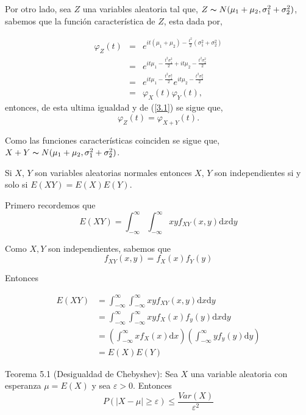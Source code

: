 \documentclass[
  letterpaper,
  DIV=11,
  numbers=noendperiod]{scrreprt}
\begin{document}
Por otro lado, sea \(Z\) una variables aleatoria tal que,
\(Z\thicksim N(\mu_{1}+\mu_{2},\sigma_{1}^{2}+\sigma_{2}^{2})\), sabemos
que la función característica de \(Z\), esta dada por,

\begin{eqnarray*}
\varphi_{Z}(t) & = & e^{it(\mu_{1}+\mu_{2})-\frac{t^{2}}{2}(\sigma_{1}^{2}+\sigma_{2}^{2})}\nonumber\\
& = & e^{it\mu_{1}-\frac{t^{2}\sigma_{1}^{2}}{2}+it\mu_{2}-\frac{t^{2}\sigma_{2}^{2}}{2}}\nonumber\\
& = & e^{it\mu_{1}-\frac{t^{2}\sigma_{1}^{2}}{2}}e^{it\mu_{2}-\frac{t^{2}\sigma_{2}^{2}}{2}}\\
& = &  \varphi_{X}(t) \varphi_{Y}(t),
\end{eqnarray*} entonces, de esta ultima igualdad y de (\ref{3.1}) se
sigue que, \[
\varphi_{Z}(t)= \varphi_{X+Y}(t).
\]

Como las funciones características coinciden se sigue que,
\(X+Y\thicksim N(\mu_{1}+\mu_{2},\sigma_{1}^{2}+\sigma_{2}^{2})\).

\begin{teor}
Si $X$, $Y$ son variables aleatorias normales entonces $X$, $Y$ son independientes si y solo si $E(XY)=E(X)E(Y)$.
\end{teor}

Primero recordemos que \[
E\left(XY\right)=\int_{-\infty}^{\infty}\int_{-\infty}^{\infty}xyf_{XY}\left(x,y\right)\mathrm{d}x\mathrm{d}y
\]

Como \(X,Y\) son independientes, sabemos que \[
f_{XY}\left(x,y\right)=f_{X}\left(x\right)f_{Y}\left(y\right)
\]

Entonces

\begin{align*}
E\left(XY\right) & =\int_{-\infty}^{\infty}\int_{-\infty}^{\infty}xyf_{XY}\left(x,y\right)\mathrm{d}x\mathrm{d}y\\
& =\int_{-\infty}^{\infty}\int_{-\infty}^{\infty}xyf_{X}\left(x\right)f_{y}\left(y\right)\mathrm{d}x\mathrm{d}y\\
& =\left(\int_{-\infty}^{\infty}xf_{X}\left(x\right)\mathrm{d}x\right)\left(\int_{-\infty}^{\infty}yf_{y}\left(y\right)\mathrm{d}y\right)\\
& =E\left(X\right)E\left(Y\right)
\end{align*}

Teorema 5.1 (Desigualdad de Chebyshev): Sea \(X\) una variable aleatoria
con esperanza \(\mu=E(X)\) y sea \(\varepsilon>0\). Entonces
\[P(|X-\mu|\geq\varepsilon)\leq\frac{Var(X)}{\varepsilon^{2}}\]
\end{document}
